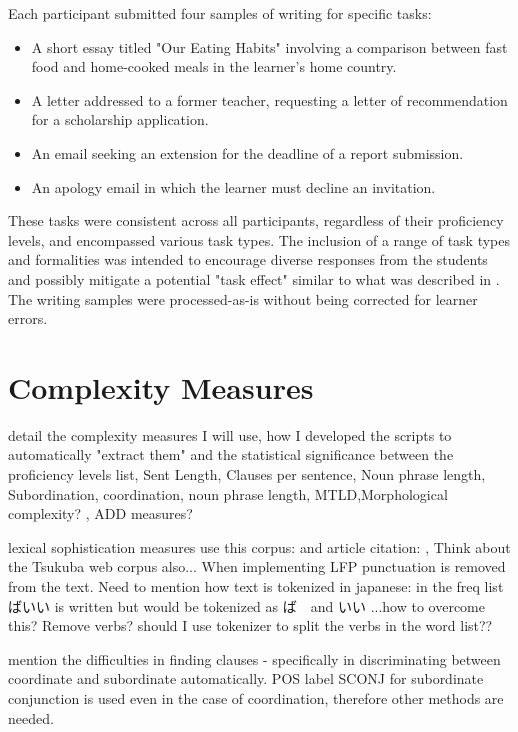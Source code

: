 Each participant submitted four samples of writing for specific tasks:
\begin{itemize}
    \item A short essay titled "Our Eating Habits" involving a comparison between fast food and home-cooked meals in the learner's home country.
    \item A letter addressed to a former teacher, requesting a letter of recommendation for a scholarship application.
    \item An email seeking an extension for the deadline of a report submission.
    \item An apology email in which the learner must decline an invitation.
\end{itemize}
These tasks were consistent across all participants, regardless of their proficiency levels, and encompassed various
task types. The inclusion of a range of task types and formalities was intended to encourage diverse responses from
the students and possibly mitigate a potential "task effect" similar to what  was described in \cite{Alexpoulou2017}.
The writing samples were processed-as-is without being corrected for learner errors.

\section{Complexity Measures}
detail the complexity measures I will use, how I developed the scripts to automatically "extract them" and the statistical significance between the proficiency levels
list, Sent Length, Clauses per sentence, Noun phrase length,  Subordination, coordination, noun phrase length, MTLD,Morphological complexity? , ADD measures?

lexical sophistication measures use this corpus: \cite{BCCWJ_List} and article citation: \cite{maekawa2014}, Think
about the Tsukuba web corpus also...
When implementing LFP punctuation is removed from the text. Need to mention how text is tokenized in japanese: in
the freq list ばいい is written but would be tokenized as ば　and いい ...how to overcome this? Remove verbs? should I use
tokenizer to split the verbs in the word list??

mention the difficulties in finding clauses - specifically in discriminating between coordinate and subordinate
automatically.  POS label SCONJ for subordinate conjunction is used even in the case of coordination, therefore
other methods are needed.

